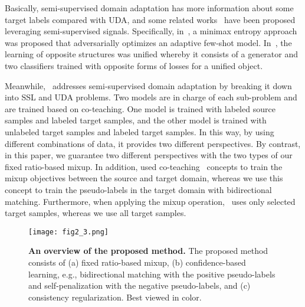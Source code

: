 \documentclass[final]{cvpr}
\begin{document}
Basically, semi-supervised domain adaptation has more information about some target labels compared with UDA, and some related works~\cite{Shuang2017, Kuniaki2019, Qin2020, Dali2020, MiCo2020} have been proposed leveraging semi-supervised signals. Specifically, in~\cite{Kuniaki2019}, a minimax entropy approach was proposed that adversarially optimizes an adaptive few-shot model. In~\cite{Qin2020}, the learning of opposite structures was unified whereby it consists of a generator and two classifiers trained with opposite forms of losses for a unified object. 

Meanwhile,~\cite{MiCo2020} addresses semi-supervised domain adaptation by breaking it down into SSL and UDA problems. Two models are in charge of each sub-problem and are trained based on co-teaching. One model is trained with labeled source samples and labeled target samples, and the other model is trained with unlabeled target samples and labeled target samples. In this way, by using different combinations of data, it provides two different perspectives. By contrast, in this paper, we guarantee two different perspectives with the two types of our fixed ratio-based mixup. In addition, \cite{MiCo2020} used co-teaching~\cite{Co-teaching} concepts to train the mixup objectives between the source and target domain, whereas we use this concept to train the pseudo-labels in the target domain with bidirectional matching. Furthermore, when applying the mixup operation,~\cite{MiCo2020} uses only selected target samples, whereas we use all target samples.

\begin{figure*}[th]
\centering
\texttt{[image: fig2\_3.png]}
\caption{\textbf{An overview of the proposed method.}
The proposed method consists of (a) fixed ratio-based mixup, (b) confidence-based learning, e.g., bidirectional matching with the positive pseudo-labels and self-penalization with the negative pseudo-labels, and (c) consistency regularization. Best viewed in color.}
\label{fig:02}
\end{figure*}
\end{document}
